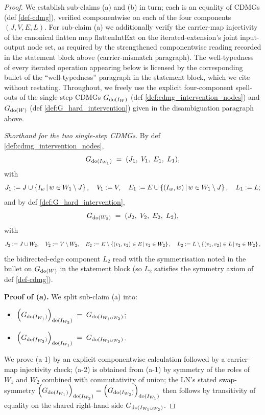 \documentclass[main]{subfiles}
\providecommand{\flattenIntExt}{\mathrm{flattenIntExt}}
\begin{document}
\begin{proof}
We establish sub-claims (a) and (b) in turn; each is an equality of CDMGs (def \ref{def-cdmg}), verified componentwise on each of the four components $(J, V, E, L)$. For sub-claim (a) we additionally verify the carrier-map injectivity of the canonical flatten map $\flattenIntExt$ on the iterated-extension's joint input-output node set, as required by the strengthened componentwise reading recorded in the statement block above (carrier-mismatch paragraph). The well-typedness of every iterated operation appearing below is licensed by the corresponding bullet of the ``well-typedness'' paragraph in the statement block, which we cite without restating. Throughout, we freely use the explicit four-component spell-outs of the single-step CDMGs $G_{\operatorname{do}(I_W)}$ (def \ref{def:cdmg_intervention_nodes}) and $G_{\operatorname{do}(W)}$ (def \ref{def:G_hard_intervention}) given in the disambiguation paragraph above.

\smallskip\noindent\emph{Shorthand for the two single-step CDMGs.}
By def \ref{def:cdmg_intervention_nodes},
\[
    G_{\operatorname{do}(I_{W_1})} \;=\; (J_1,\; V_1,\; E_1,\; L_1),
\]
with
\[
    J_1 := J \cup \left \{ I_w \,\middle|\, w \in W_1 \setminus J \right \}, \quad V_1 := V, \quad E_1 := E \cup \left \{ (I_w, w) \,\middle|\, w \in W_1 \setminus J \right \}, \quad L_1 := L;
\]
and by def \ref{def:G_hard_intervention},
\[
    G_{\operatorname{do}(W_2)} \;=\; (J_2,\; V_2,\; E_2,\; L_2),
\]
with
\[
    J_2 := J \cup W_2, \quad V_2 := V \setminus W_2, \quad E_2 := E \setminus \left \{ (v_1, v_2) \in E \,\middle|\, v_2 \in W_2 \right \}, \quad L_2 := L \setminus \left \{ (v_1, v_2) \in L \,\middle|\, v_2 \in W_2 \right \},
\]
the bidirected-edge component $L_2$ read with the symmetrisation noted in the bullet on $G_{\operatorname{do}(W)}$ in the statement block (so $L_2$ satisfies the symmetry axiom of def \ref{def-cdmg}).

\medskip\noindent\textbf{Proof of (a).}
We split sub-claim (a) into:
\begin{itemize}
    \item[(a-1)] $\left ( G_{\operatorname{do}(I_{W_1})} \right )_{\operatorname{do}(I_{W_2})} \;=\; G_{\operatorname{do}(I_{W_1 \cup W_2})}$;
    \item[(a-2)] $\left ( G_{\operatorname{do}(I_{W_2})} \right )_{\operatorname{do}(I_{W_1})} \;=\; G_{\operatorname{do}(I_{W_1 \cup W_2})}$.
\end{itemize}
We prove (a-1) by an explicit componentwise calculation followed by a carrier-map injectivity check; (a-2) is obtained from (a-1) by symmetry of the roles of $W_1$ and $W_2$ combined with commutativity of union; the LN's stated swap-symmetry $\left ( G_{\operatorname{do}(I_{W_1})} \right )_{\operatorname{do}(I_{W_2})} = \left ( G_{\operatorname{do}(I_{W_2})} \right )_{\operatorname{do}(I_{W_1})}$ then follows by transitivity of equality on the shared right-hand side $G_{\operatorname{do}(I_{W_1 \cup W_2})}$.


\end{proof}
\end{document}
